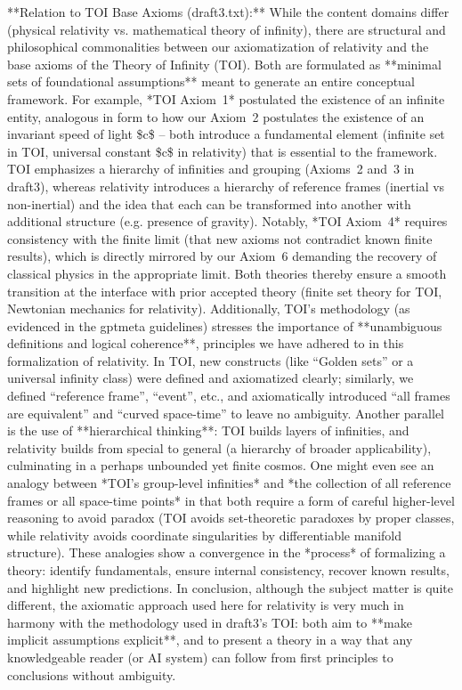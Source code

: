 \documentclass{article}
\begin{document}
**Relation to TOI Base Axioms (draft3.txt):** While the content domains differ (physical relativity vs. mathematical theory of infinity), there are structural and philosophical commonalities between our axiomatization of relativity and the base axioms of the Theory of Infinity (TOI). Both are formulated as **minimal sets of foundational assumptions** meant to generate an entire conceptual framework. For example, *TOI Axiom 1* postulated the existence of an infinite entity, analogous in form to how our Axiom 2 postulates the existence of an invariant speed of light \$c\$ – both introduce a fundamental element (infinite set in TOI, universal constant \$c\$ in relativity) that is essential to the framework. TOI emphasizes a hierarchy of infinities and grouping (Axioms 2 and 3 in draft3), whereas relativity introduces a hierarchy of reference frames (inertial vs non-inertial) and the idea that each can be transformed into another with additional structure (e.g. presence of gravity). Notably, *TOI Axiom 4* requires consistency with the finite limit (that new axioms not contradict known finite results), which is directly mirrored by our Axiom 6 demanding the recovery of classical physics in the appropriate limit. Both theories thereby ensure a smooth transition at the interface with prior accepted theory (finite set theory for TOI, Newtonian mechanics for relativity). Additionally, TOI’s methodology (as evidenced in the gptmeta guidelines) stresses the importance of **unambiguous definitions and logical coherence**, principles we have adhered to in this formalization of relativity. In TOI, new constructs (like “Golden sets” or a universal infinity class) were defined and axiomatized clearly; similarly, we defined “reference frame”, “event”, etc., and axiomatically introduced “all frames are equivalent” and “curved space-time” to leave no ambiguity. Another parallel is the use of **hierarchical thinking**: TOI builds layers of infinities, and relativity builds from special to general (a hierarchy of broader applicability), culminating in a perhaps unbounded yet finite cosmos. One might even see an analogy between *TOI’s group-level infinities* and *the collection of all reference frames or all space-time points* in that both require a form of careful higher-level reasoning to avoid paradox (TOI avoids set-theoretic paradoxes by proper classes, while relativity avoids coordinate singularities by differentiable manifold structure). These analogies show a convergence in the *process* of formalizing a theory: identify fundamentals, ensure internal consistency, recover known results, and highlight new predictions. In conclusion, although the subject matter is quite different, the axiomatic approach used here for relativity is very much in harmony with the methodology used in draft3’s TOI: both aim to **make implicit assumptions explicit**, and to present a theory in a way that any knowledgeable reader (or AI system) can follow from first principles to conclusions without ambiguity.
\end{document}
